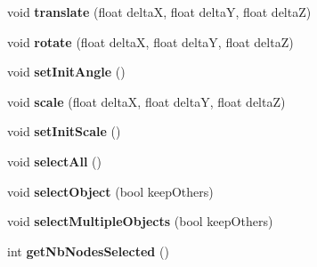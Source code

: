 \begin{DoxyCompactItemize}
\item 
\hypertarget{class_interface_graphique_1_1_engine_a7383d6a2834b761bf0e311fdbf460d24}{void {\bfseries translate} (float delta\-X, float delta\-Y, float delta\-Z)}\label{class_interface_graphique_1_1_engine_a7383d6a2834b761bf0e311fdbf460d24}

\item 
\hypertarget{class_interface_graphique_1_1_engine_a13f9dce829254dbc31fe01aadd1ba8c6}{void {\bfseries rotate} (float delta\-X, float delta\-Y, float delta\-Z)}\label{class_interface_graphique_1_1_engine_a13f9dce829254dbc31fe01aadd1ba8c6}

\item 
\hypertarget{class_interface_graphique_1_1_engine_aed36e2c31333883918d7103305b96236}{void {\bfseries set\-Init\-Angle} ()}\label{class_interface_graphique_1_1_engine_aed36e2c31333883918d7103305b96236}

\item 
\hypertarget{class_interface_graphique_1_1_engine_a0129ba7f711fbf300f354611a8febfd1}{void {\bfseries scale} (float delta\-X, float delta\-Y, float delta\-Z)}\label{class_interface_graphique_1_1_engine_a0129ba7f711fbf300f354611a8febfd1}

\item 
\hypertarget{class_interface_graphique_1_1_engine_a2dab2445d57cc6cfd90f75e613360614}{void {\bfseries set\-Init\-Scale} ()}\label{class_interface_graphique_1_1_engine_a2dab2445d57cc6cfd90f75e613360614}

\item 
\hypertarget{class_interface_graphique_1_1_engine_a2e7f0b1331fd2ee58915a022ec3d579d}{void {\bfseries select\-All} ()}\label{class_interface_graphique_1_1_engine_a2e7f0b1331fd2ee58915a022ec3d579d}

\item 
\hypertarget{class_interface_graphique_1_1_engine_a18cc8cefa5e5a0544d71b80e3c5d8335}{void {\bfseries select\-Object} (bool keep\-Others)}\label{class_interface_graphique_1_1_engine_a18cc8cefa5e5a0544d71b80e3c5d8335}

\item 
\hypertarget{class_interface_graphique_1_1_engine_a8bd0f5e2f7e3549600ba8b5197c344cc}{void {\bfseries select\-Multiple\-Objects} (bool keep\-Others)}\label{class_interface_graphique_1_1_engine_a8bd0f5e2f7e3549600ba8b5197c344cc}

\item 
\hypertarget{class_interface_graphique_1_1_engine_a27a5122603c015861fa75a756c564805}{int {\bfseries get\-Nb\-Nodes\-Selected} ()}\label{class_interface_graphique_1_1_engine_a27a5122603c015861fa75a756c564805}


\end{DoxyCompactItemize}

